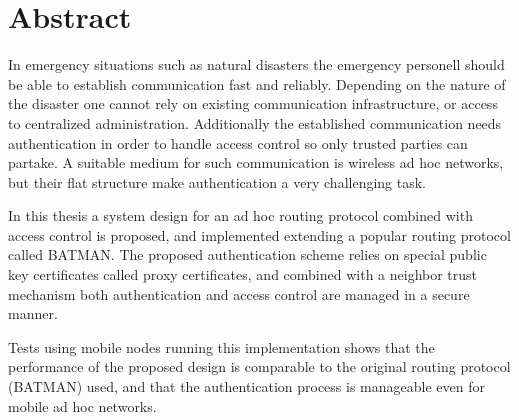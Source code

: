 \chapter*{Abstract}


In emergency situations such as natural disasters the emergency personell should
be able to establish communication fast and reliably. Depending on the nature of
the disaster one cannot rely on existing communication infrastructure, or access
to centralized administration. Additionally the established communication needs
authentication in order to handle access control so only trusted parties can
partake. A suitable medium for such communication is wireless ad hoc networks,
but their flat structure make authentication a very challenging task.


In this thesis a system design for an ad hoc routing protocol combined with
access control is proposed, and implemented extending a popular routing protocol
called BATMAN. The proposed authentication scheme relies on special public key
certificates called proxy certificates, and combined with a neighbor trust
mechanism both authentication and access control are managed in a secure manner.


Tests using mobile nodes running this implementation shows that the performance
of the proposed design is comparable to the original routing protocol (BATMAN)
used, and that the authentication process is manageable even for mobile ad hoc
networks.
